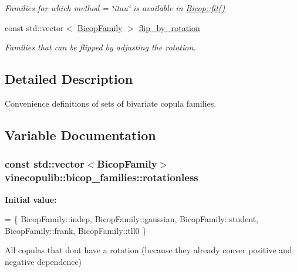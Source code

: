 \begin{DoxyCompactItemize}
\begin{DoxyCompactList}\small\item\em Families for which {\ttfamily method = \char`\"{}itau\char`\"{}} is available in \hyperlink{classvinecopulib_1_1_bicop_a2d509a8b404a73ef17f04a0678e90a71}{Bicop\+::fit()} \end{DoxyCompactList}\item 
const std\+::vector$<$ \hyperlink{namespacevinecopulib_a42e95cc06d33896199caab0c11ad44f3}{Bicop\+Family} $>$ \hyperlink{namespacevinecopulib_1_1bicop__families_ae1ae1673e3d4a9c57bd9df074e17a3b9}{flip\+\_\+by\+\_\+rotation}\hypertarget{namespacevinecopulib_1_1bicop__families_ae1ae1673e3d4a9c57bd9df074e17a3b9}{}\label{namespacevinecopulib_1_1bicop__families_ae1ae1673e3d4a9c57bd9df074e17a3b9}

\begin{DoxyCompactList}\small\item\em Families that can be flipped by adjusting the rotation. \end{DoxyCompactList}\end{DoxyCompactItemize}


\subsection{Detailed Description}
Convenience definitions of sets of bivariate copula families. 

\subsection{Variable Documentation}
\subsubsection[{\texorpdfstring{rotationless}{rotationless}}]{\setlength{\rightskip}{0pt plus 5cm}const std\+::vector$<${\bf Bicop\+Family}$>$ vinecopulib\+::bicop\+\_\+families\+::rotationless}\hypertarget{namespacevinecopulib_1_1bicop__families_ac221bc84c32d2836692ed40d89439928}{}\label{namespacevinecopulib_1_1bicop__families_ac221bc84c32d2836692ed40d89439928}
{\bfseries Initial value\+:}
\begin{DoxyCode}
= \{
            BicopFamily::indep, 
            BicopFamily::gaussian, 
            BicopFamily::student, 
            BicopFamily::frank, 
            BicopFamily::tll0
        \}
\end{DoxyCode}
All copulas that don\textquotesingle{}t have a rotation (because they already conver positive and negative dependence) 